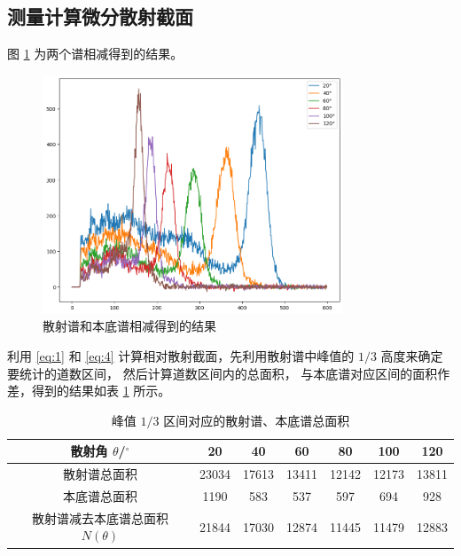 \documentclass[revtex4-2]{mpltx}
\begin{document}
\subsection{测量计算微分散射截面}
图 \ref{fig:3} 为两个谱相减得到的结果。
\begin{figure}[htbp]
    \centering
    \includegraphics[width=0.8\textwidth]{3.png}
    \caption{散射谱和本底谱相减得到的结果}
    \label{fig:3}
\end{figure}
利用 \eqref{eq:1} 和 \eqref{eq:4} 计算相对散射截面，先利用散射谱中峰值的 $1/3$ 高度来确定要统计的道数区间，
然后计算道数区间内的总面积，
与本底谱对应区间的面积作差，得到的结果如表 \ref{tab:3} 所示。

\begin{table}[htbp]
    \centering
    \caption{峰值 $1/3$ 区间对应的散射谱、本底谱总面积}
    \label{tab:3}
    \begin{tabular}{ccccccc}
        \hline
        散射角 $\theta$/${}^\circ$ & 20 & 40 & 60 & 80 & 100 & 120 \\
        \hline
        散射谱总面积 & 23034 & 17613 & 13411 & 12142 & 12173 & 13811 \\
        本底谱总面积 & 1190 & 583 & 537 & 597 & 694 & 928 \\
        散射谱减去本底谱总面积 $N(\theta)$ & 21844 & 17030 & 12874 & 11445 & 11479 & 12883 \\
        \hline
    \end{tabular}
\end{table}
\end{document}
